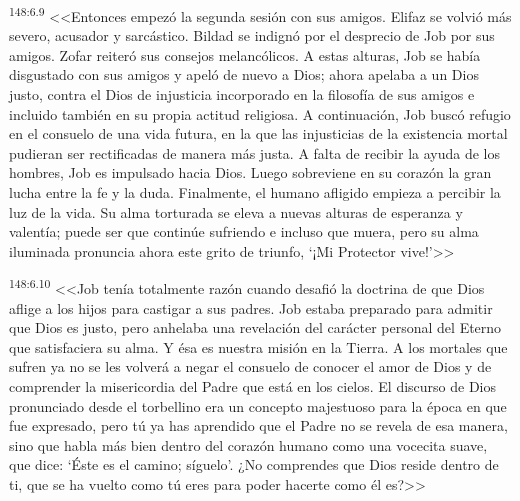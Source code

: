 \par 
\textsuperscript{148:6.9} <<Entonces empezó la segunda sesión con sus amigos. Elifaz se volvió más severo, acusador y sarcástico. Bildad se indignó por el desprecio de Job por sus amigos. Zofar reiteró sus consejos melancólicos. A estas alturas, Job se había disgustado con sus amigos y apeló de nuevo a Dios; ahora apelaba a un Dios justo, contra el Dios de injusticia incorporado en la filosofía de sus amigos e incluido también en su propia actitud religiosa. A continuación, Job buscó refugio en el consuelo de una vida futura, en la que las injusticias de la existencia mortal pudieran ser rectificadas de manera más justa. A falta de recibir la ayuda de los hombres, Job es impulsado hacia Dios. Luego sobreviene en su corazón la gran lucha entre la fe y la duda. Finalmente, el humano afligido empieza a percibir la luz de la vida. Su alma torturada se eleva a nuevas alturas de esperanza y valentía; puede ser que continúe sufriendo e incluso que muera, pero su alma iluminada pronuncia ahora este grito de triunfo, `¡Mi Protector vive!'>>

\par 
\textsuperscript{148:6.10} <<Job tenía totalmente razón cuando desafió la doctrina de que Dios aflige a los hijos para castigar a sus padres. Job estaba preparado para admitir que Dios es justo, pero anhelaba una revelación del carácter personal del Eterno que satisfaciera su alma. Y ésa es nuestra misión en la Tierra. A los mortales que sufren ya no se les volverá a negar el consuelo de conocer el amor de Dios y de comprender la misericordia del Padre que está en los cielos. El discurso de Dios pronunciado desde el torbellino era un concepto majestuoso para la época en que fue expresado, pero tú ya has aprendido que el Padre no se revela de esa manera, sino que habla más bien dentro del corazón humano como una vocecita suave, que dice: `Éste es el camino; síguelo'. ¿No comprendes que Dios reside dentro de ti, que se ha vuelto como tú eres para poder hacerte como él es?>>

